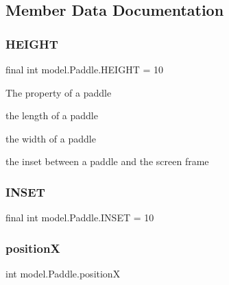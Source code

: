 \subsection{Member Data Documentation}
\hypertarget{classmodel_1_1_paddle_a2e269d6e61b7b809c3b90c2007994fcf}{}\label{classmodel_1_1_paddle_a2e269d6e61b7b809c3b90c2007994fcf} 
\subsubsection{\texorpdfstring{H\+E\+I\+G\+HT}{HEIGHT}}
{\footnotesize\ttfamily final int model.\+Paddle.\+H\+E\+I\+G\+HT = 10\hspace{0.3cm}{\ttfamily [private]}}

The property of a paddle
\begin{DoxyItemize}
\item the length of a paddle
\item the width of a paddle
\item the inset between a paddle and the screen frame 
\end{DoxyItemize}\hypertarget{classmodel_1_1_paddle_a4bb13cdef375eba471c680ddc87407ba}{}\label{classmodel_1_1_paddle_a4bb13cdef375eba471c680ddc87407ba} 
\subsubsection{\texorpdfstring{I\+N\+S\+ET}{INSET}}
{\footnotesize\ttfamily final int model.\+Paddle.\+I\+N\+S\+ET = 10\hspace{0.3cm}{\ttfamily [private]}}

\hypertarget{classmodel_1_1_paddle_a18c9d408e60c6651a135f1d86d566a10}{}\label{classmodel_1_1_paddle_a18c9d408e60c6651a135f1d86d566a10} 
\subsubsection{\texorpdfstring{positionX}{positionX}}
{\footnotesize\ttfamily int model.\+Paddle.\+positionX\hspace{0.3cm}{\ttfamily [private]}}

